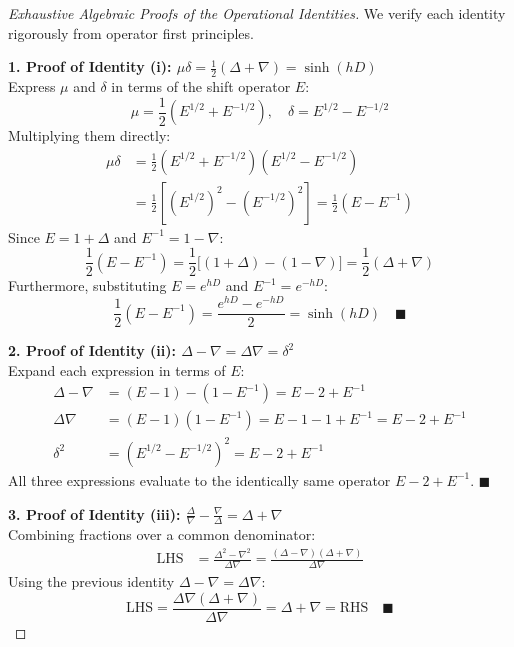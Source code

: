 \begin{proof}[Exhaustive Algebraic Proofs of the Operational Identities]
We verify each identity rigorously from operator first principles.

\medskip
\noindent\textbf{1. Proof of Identity (i): $\mu \delta = \frac{1}{2}(\Delta + \nabla) = \sinh(hD)$} \\
Express $\mu$ and $\delta$ in terms of the shift operator $E$:
\begin{equation}
    \mu = \frac{1}{2}\left(E^{1/2} + E^{-1/2}\right), \quad \delta = E^{1/2} - E^{-1/2}
\end{equation}
Multiplying them directly:
\begin{align}
    \mu \delta &= \frac{1}{2}\left(E^{1/2} + E^{-1/2}\right)\left(E^{1/2} - E^{-1/2}\right) \nonumber \\
    &= \frac{1}{2}\left[\left(E^{1/2}\right)^2 - \left(E^{-1/2}\right)^2\right] = \frac{1}{2}\left(E - E^{-1}\right)
\end{align}
Since $E = 1 + \Delta$ and $E^{-1} = 1 - \nabla$:
\begin{equation}
    \frac{1}{2}\left(E - E^{-1}\right) = \frac{1}{2}\big[(1 + \Delta) - (1 - \nabla)\big] = \boxed{\frac{1}{2}(\Delta + \nabla)}
\end{equation}
Furthermore, substituting $E = e^{hD}$ and $E^{-1} = e^{-hD}$:
\begin{equation}
    \frac{1}{2}\left(E - E^{-1}\right) = \frac{e^{hD} - e^{-hD}}{2} = \boxed{\sinh(hD)} \quad \blacksquare
\end{equation}

\medskip
\noindent\textbf{2. Proof of Identity (ii): $\Delta - \nabla = \Delta \nabla = \delta^2$} \\
Expand each expression in terms of $E$:
\begin{align}
    \Delta - \nabla &= (E - 1) - (1 - E^{-1}) = E - 2 + E^{-1} \\
    \Delta \nabla &= (E - 1)(1 - E^{-1}) = E - 1 - 1 + E^{-1} = E - 2 + E^{-1} \\
    \delta^2 &= \left(E^{1/2} - E^{-1/2}\right)^2 = E - 2 + E^{-1}
\end{align}
All three expressions evaluate to the identically same operator $E - 2 + E^{-1}$. $\blacksquare$

\medskip
\noindent\textbf{3. Proof of Identity (iii): $\frac{\Delta}{\nabla} - \frac{\nabla}{\Delta} = \Delta + \nabla$} \\
Combining fractions over a common denominator:
\begin{align}
    \text{LHS} &= \frac{\Delta^2 - \nabla^2}{\Delta \nabla} = \frac{(\Delta - \nabla)(\Delta + \nabla)}{\Delta \nabla}
\end{align}
Using the previous identity $\Delta - \nabla = \Delta \nabla$:
\begin{equation}
    \text{LHS} = \frac{\Delta \nabla (\Delta + \nabla)}{\Delta \nabla} = \Delta + \nabla = \text{RHS} \quad \blacksquare
\end{equation}


\end{proof}
